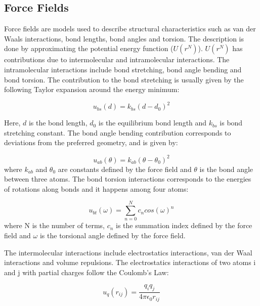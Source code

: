 \subsection{Force Fields }
Force fields are models used to describe structural characteristics such as van der Waals interactions, bond lengths, bond angles and torsion. The description is done by approximating the potential energy function ($U(r^N)$). $U(r^N)$ has contributions due to intermolecular and intramolecular interactions. The intramolecular interactions include bond stretching, bond angle bending and bond torsion. The contribution to the bond stretching is usually given by the following Taylor expansion around the energy minimum:

\begin{equation}
u_{bs}(d) = k_{bs} (d - d_{0})^2
\end{equation}

Here, $d$ is the bond length, $d_{0}$ is the equilibrium bond length and $k_{bs}$ is bond stretching constant. The bond angle bending contribution corresponds to deviations from the preferred geometry, and is given by:

\begin{equation}
u_{ab}(\theta) = k_{ab} (\theta - \theta _{0})^2
\end{equation}
where $k_{ab}$ and $\theta _{0}$ are constants defined by the force field and $\theta$ is the bond angle between three atoms.  The bond torsion interactions corresponds to the energies of rotations along bonds and it happens among four atoms:

\begin{equation}
u_{bt}(\omega) = \sum_{n=0}^{N}  c_{n} cos(\omega) ^{n}
\end{equation}
where N is the number of terms, $c_{n}$ is the summation index defined by the force field and $\omega$ is the torsional angle defined by the force field. 

The intermolecular interactions include electrostatics interactions, van der Waal interactions and volume repulsions. The electrostatics interactions of two atoms i and j with partial charges follow the Coulomb's Law:

\begin{equation}
u_{q}(r_{ij}) = \frac{q_{i}q_{j}}{4 \pi \epsilon _{0} r_{ij}}
\end{equation} 

